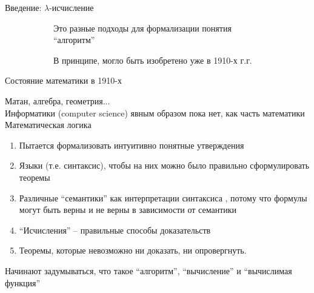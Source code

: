 \begin{frame}{Введение: $\lambda$-исчисление}
\begin{figure}
\begin{subfigure}[t]{0.45\textwidth}
Это разные подходы для формализации понятия ``алгоритм''
\vspace{1em}

В принципе, могло быть изобретено уже в 1910-х г.г.

    \end{subfigure}
  \end{figure}


\end{frame}

\begin{frame}{Состояние математики в 1910-х}

    Матан, алгебра, геометрия...\\
    Информатики (computer science) явным образом пока нет, как часть математики\\

    Математическая логика
    \begin{enumerate}
      \item Пытается формализовать интуитивно понятные утверждения
      \item Языки (т.е. синтаксис), чтобы на них можно было правильно сформулировать теоремы
      \item Различные ``семантики'' как интерпретации синтаксиса , потому что формулы могут быть верны и не верны в зависимости от семантики
      \item ``Исчисления'' -- правильные способы доказательств
      \item Теоремы, которые невозможно ни доказать, ни опровергнуть.
    \end{enumerate}
  Начинают задумываться, что такое ``алгоритм'', ``вычисление'' и ``вычислимая функция''

\end{frame}

